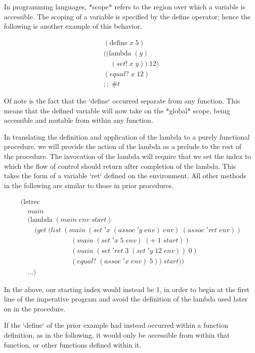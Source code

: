 In programming languages, *scope* refers to the region over which a variable is
accessible. The scoping of a variable is specified by the define operator; hence the 
following is another example of this behavior.

\begin{align*}
& (\text{define} \; x \; 5)
\\& ((\text{lambda} \; (y)
\\& \quad (set! \; x \; y)) \; 12)
\\& (equal? \; x \; 12) \; 
\\& ;; \; \#t
\end{align*}

Of note is the fact that the `define` occurred separate from any function. This 
means that the defined variable will now take on the *global* scope, being accessible 
and mutable from within any function. 

In translating the definition and application of the lambda to a purely functional
procedure, we will provide the action of the lambda as a prelude to the rest of the 
procedure. The invocation of the lambda will require that we set the index to which
the flow of control should return after completion of the lambda. This takes the form
of a variable `ret` defined on the environment. All other methods in the following are
similar to those in prior procedures.

\begin{align*}
& (\text{letrec} \; 
\\& \quad main \; 
\\& \quad (\text{lambda} \; (main \; env \; start)
\\& \qquad (get \; (list \; (main \; (set \; 'x \; (assoc \; 'y \; env) \; env) \; (assoc \; 'ret \; env))
\\& \qquad \qquad \qquad \quad \; (main \; (set \; 'x \; 5 \; env) \; (+ \; 1 \; start))
\\& \qquad \qquad \qquad \quad \; (main \; (set \; 'ret \; 3 \; (set \; 'y \; 12 \; env)) \; 0)
\\& \qquad \qquad \qquad \quad \; (equal? \; (assoc \; 'x \; env) \; 5)) \; start))
\\& \quad \dots)
\end{align*}

In the above, our starting index would instead be 1, in order to begin at the first
line of the imperative program and avoid the definition of the lambda used later on
in the procedure.

If the `define` of the prior example had instead occurred within a function definition, 
as in the following, it would only be accessible from within that function, or other 
functions defined within it.

